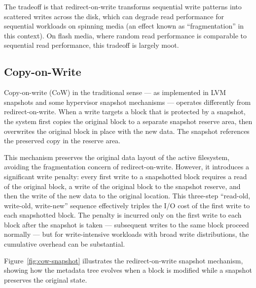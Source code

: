 The tradeoff is that redirect-on-write transforms sequential write patterns into scattered writes across the disk, which can degrade read performance for sequential workloads on spinning media (an effect known as ``fragmentation'' in this context). On flash media, where random read performance is comparable to sequential read performance, this tradeoff is largely moot.

\subsection{Copy-on-Write}

Copy-on-write (CoW) in the traditional sense --- as implemented in LVM snapshots and some hypervisor snapshot mechanisms --- operates differently from redirect-on-write. When a write targets a block that is protected by a snapshot, the system first copies the original block to a separate snapshot reserve area, then overwrites the original block in place with the new data. The snapshot references the preserved copy in the reserve area.

This mechanism preserves the original data layout of the active filesystem, avoiding the fragmentation concern of redirect-on-write. However, it introduces a significant write penalty: every first write to a snapshotted block requires a read of the original block, a write of the original block to the snapshot reserve, and then the write of the new data to the original location. This three-step ``read-old, write-old, write-new'' sequence effectively triples the I/O cost of the first write to each snapshotted block. The penalty is incurred only on the first write to each block after the snapshot is taken --- subsequent writes to the same block proceed normally --- but for write-intensive workloads with broad write distributions, the cumulative overhead can be substantial.

Figure~\ref{fig:cow-snapshot} illustrates the redirect-on-write snapshot mechanism, showing how the metadata tree evolves when a block is modified while a snapshot preserves the original state.

